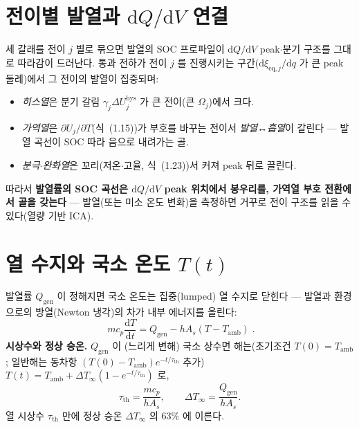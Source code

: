\documentclass[11pt,a4paper]{article}
\newcommand{\dd}{\mathrm{d}}
\newcommand{\eq}{\mathrm{eq}}
\newcommand{\hys}{\mathrm{hys}}
\newcommand{\gen}{\mathrm{gen}}
\newcommand{\amb}{\mathrm{amb}}
\newcommand{\Th}{\mathrm{th}}
\begin{document}
\section{전이별 발열과 $\dd Q/\dd V$ 연결}\label{sec:h_perpeak}
세 갈래를 전이 $j$ 별로 묶으면 발열의 SOC 프로파일이 $\dd Q/\dd V$ peak$\cdot$분기 구조를 그대로 따라감이
드러난다. 통과 전하가 전이 $j$ 를 진행시키는 구간($\dd\xi_{\eq,j}/\dd q$ 가 큰 peak 둘레)에서 그 전이의 발열이
집중되며:
\begin{itemize}[leftmargin=1.4em,itemsep=2pt]
\item \emph{히스열}은 분기 갈림 $\gamma_j\Delta U_j^\hys$ 가 큰 전이(큰 $\Omega_j$)에서 크다.
\item \emph{가역열}은 $\partial U_j/\partial T$(식~(1.15))가 부호를 바꾸는 전이서 \emph{발열↔흡열}이 갈린다 — 발열
  곡선이 SOC 따라 음으로 내려가는 골.
\item \emph{분극$\cdot$완화열}은 꼬리(저온$\cdot$고율, 식~(1.23))서 커져 peak 뒤로 끌린다.
\end{itemize}
따라서 \textbf{발열률의 SOC 곡선은 $\dd Q/\dd V$ peak 위치에서 봉우리를, 가역열 부호 전환에서 골을 갖는다} —
발열(또는 미소 온도 변화)을 측정하면 거꾸로 전이 구조를 읽을 수 있다(열량 기반 ICA).

\section{열 수지와 국소 온도 $T(t)$}\label{sec:h_balance}
발열률 $Q_\gen$ 이 정해지면 국소 온도는 집중(lumped) 열 수지로 닫힌다 — 발열과 환경으로의 방열(Newton 냉각)의
차가 내부 에너지를 올린다:
\begin{equation}
\boxed{\;m c_p\frac{\dd T}{\dd t}=Q_\gen-hA_s(T-T_\amb)\;.}
\label{eq:h_balance}
\end{equation}
\textbf{시상수와 정상 승온.} $Q_\gen$ 이 (느리게 변해) 국소 상수면 해는(초기조건 $T(0)=T_\amb$; 일반해는 동차항
$(T(0)-T_\amb)e^{-t/\tau_\Th}$ 추가) $T(t)=T_\amb+\Delta T_\infty(1-e^{-t/\tau_\Th})$ 로,
\begin{equation}
\tau_\Th=\frac{mc_p}{hA_s},\qquad \Delta T_\infty=\frac{Q_\gen}{hA_s}.
\label{eq:h_tau}
\end{equation}
열 시상수 $\tau_\Th$ 만에 정상 승온 $\Delta T_\infty$ 의 $63\%$ 에 이른다.
\end{document}
